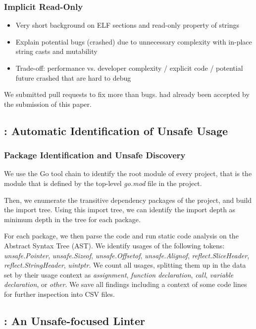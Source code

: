 \subsubsection*{Implicit Read-Only}

\begin{itemize}
    \item Very short background on ELF sections and read-only property of strings
    \item Explain potential bugs (crashed) due to unnecessary complexity with in-place string casts and mutability
    \item Trade-off: performance vs. developer complexity / explicit code / potential future crashed that are hard to debug
\end{itemize}

We submitted \numberPRs{} pull requests to fix more than \numberBugsFixed{} bugs. \numberPRsMerged{} had already been accepted by the submission of this paper.


\subsection{\toolUsage{}: Automatic Identification of Unsafe Usage}

\subsubsection*{Package Identification and Unsafe Discovery}

We use the Go tool chain to identify the root module of every project, that is the module that is defined by the top-level \textit{go.mod} file in the project.

Then, we enumerate the transitive dependency packages of the project, and build the import tree. Using this import tree, we can identify the import depth as minimum depth in the tree for each package.

For each package, we then parse the code and run static code analysis on the Abstract Syntax Tree (AST). We identify usages of the following \unsafe{} tokens: \textit{unsafe.Pointer}, \textit{unsafe.Sizeof}, \textit{unsafe.Offsetof}, \textit{unsafe.Alignof}, \textit{reflect.SliceHeader}, \textit{reflect.StringHeader}, \textit{uintptr}.
We count all usages, splitting them up in the data set by their usage context as \textit{assignment}, \textit{function declaration}, \textit{call}, \textit{variable declaration}, or \textit{other}.
We save all findings including a context of some code lines for further inspection into CSV files.

\subsection{\toolSA{}: An Unsafe-focused Linter}
